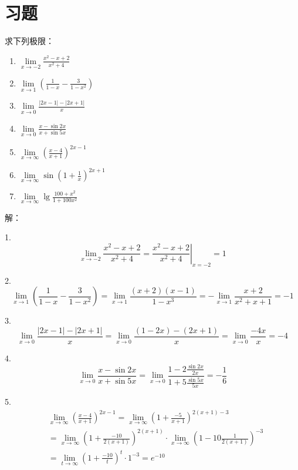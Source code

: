 \section{习题}

\begin{exercise}
求下列极限：
\begin{enumerate}
    \item $\underset{x\rightarrow -2}{\lim}\frac{x^2-x+2}{x^2+4}$
    \item $\underset{x\rightarrow 1}{\lim}\left( \frac{1}{1-x}-\frac{3}{1-x^2} \right) $
    \item $\underset{x\rightarrow 0}{\lim}\frac{\left| 2x-1 \right|-\left| 2x+1 \right|}{x}$
    \item $\underset{x\rightarrow 0}{\lim}\frac{x-\sin 2x}{x+\sin 5x}$
    \item $\underset{x\rightarrow \infty}{\lim}\left( \frac{x-4}{x+1} \right) ^{2x-1}$
    \item $\underset{x\rightarrow \infty}{\lim}\sin \left( 1+\frac{1}{x} \right) ^{2x+1}$
    \item $\underset{x\rightarrow \infty}{\lim}\lg \frac{100+x^2}{1+100x^2}$
\end{enumerate}
\end{exercise}

解：

1.
\[
\underset{x\rightarrow -2}{\lim}\frac{x^2-x+2}{x^2+4}=\left. \frac{x^2-x+2}{x^2+4} \right|_{x=-2}=1
\]

2.
\[
\underset{x\rightarrow 1}{\lim}\left( \frac{1}{1-x}-\frac{3}{1-x^2} \right) =\underset{x\rightarrow 1}{\lim}\frac{\left( x+2 \right) \left( x-1 \right)}{1-x^3}=-\underset{x\rightarrow 1}{\lim}\frac{x+2}{x^2+x+1}=-1
\]

3.
\[
\underset{x\rightarrow 0}{\lim}\frac{\left| 2x-1 \right|-\left| 2x+1 \right|}{x}=\underset{x\rightarrow 0}{\lim}\frac{\left( 1-2x \right) -\left( 2x+1 \right)}{x}=\underset{x\rightarrow 0}{\lim}\frac{-4x}{x}=-4
\]

4.
\[
\underset{x\rightarrow 0}{\lim}\frac{x-\sin 2x}{x+\sin 5x}=\underset{x\rightarrow 0}{\lim}\frac{1-2\frac{\sin 2x}{2x}}{1+5\frac{\sin 5x}{5x}}=-\frac{1}{6}
\]

5.
\begin{align*}
&\underset{x\rightarrow \infty}{\lim}\left( \frac{x-4}{x+1} \right) ^{2x-1}=\underset{x\rightarrow \infty}{\lim}\left( 1+\frac{-5}{x+1} \right) ^{2\left( x+1 \right) -3} \\
&=\underset{x\rightarrow \infty}{\lim}\left( 1+\frac{-10}{2\left( x+1 \right)} \right) ^{2\left( x+1 \right)}\cdot \underset{x\rightarrow \infty}{\lim}\left( 1-10\frac{1}{2\left( x+1 \right)} \right) ^{-3} \\
&=\underset{t\rightarrow \infty}{\lim}\left( 1+\frac{-10}{t} \right) ^t\cdot 1^{-3}=e^{-10}
\end{align*}

